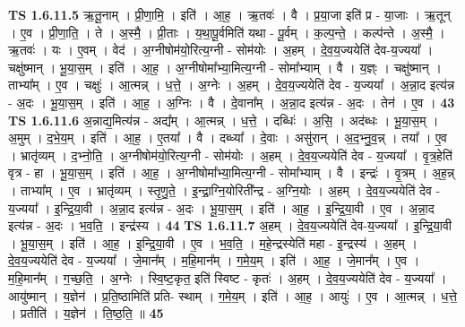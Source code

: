 \documentclass[17pt]{extarticle}
\begin{document}
                                \textbf{ TS 1.6.11.5} \newline
                  ऋ॒तू॒नाम् । प्री॒णा॒मि॒ । इति॑ । आ॒ह॒ । ऋ॒तवः॑ । वै । प्र॒या॒जा इति॑ प्र - या॒जाः । ऋ॒तून् । ए॒व । प्री॒णा॒ति॒ । ते । अ॒स्मै॒ । प्री॒ताः । य॒था॒पू॒र्वमिति॑ यथा - पू॒र्वम् । क॒ल्प॒न्ते॒ । कल्प॑न्ते । अ॒स्मै॒ । ऋ॒तवः॑ । यः । ए॒वम् । वेद॑ । अ॒ग्नीषोम॑यो॒रित्य॒ग्नी - सोम॑योः । अ॒हम् । दे॒व॒य॒ज्ययेति॑ देव-य॒ज्यया᳚ । चक्षु॑ष्मान् । भू॒या॒स॒म् । इति॑ । आ॒ह॒ । अ॒ग्नीषोमा᳚भ्या॒मित्य॒ग्नी - सोमा᳚भ्याम् । वै । य॒ज्ञ्ः । चक्षु॑ष्मान् । ताभ्या᳚म् । ए॒व । चक्षुः॑ । आ॒त्मन्न् । ध॒त्ते॒ । अ॒ग्नेः । अ॒हम् । दे॒व॒य॒ज्ययेति॑ देव - य॒ज्यया᳚ । अ॒न्ना॒द इत्य॑न्न - अ॒दः । भू॒या॒स॒म् । इति॑ । आ॒ह॒ । अ॒ग्निः । वै । दे॒वाना᳚म् । अ॒न्ना॒द इत्य॑न्न - अ॒दः । तेन॑ । ए॒व । \textbf{  43} \newline
                  \newline
                                \textbf{ TS 1.6.11.6} \newline
                  अ॒न्नाद्य॒मित्य॑न्न - अद्य᳚म् । आ॒त्मन्न् । ध॒त्ते॒ । दब्धिः॑ । अ॒सि॒ । अद॑ब्धः । भू॒या॒स॒म् । अ॒मुम् । द॒भे॒य॒म् । इति॑ । आ॒ह॒ । ए॒तया᳚ । वै । दब्ध्या᳚ । दे॒वाः । असु॑रान् । अ॒द॒भ्नु॒व॒॒न्न् । तया᳚ । ए॒व । भ्रातृ॑व्यम् । द॒भ्नो॒ति॒ । अ॒ग्नीषोम॑यो॒रित्य॒ग्नी - सोम॑योः । अ॒हम् । दे॒व॒य॒ज्ययेति॑ देव - य॒ज्यया᳚ । वृ॒त्र॒हेति॑ वृत्र - हा । भू॒या॒स॒म् । इति॑ । आ॒ह॒ । अ॒ग्नीषोमा᳚भ्या॒मित्य॒ग्नी - सोमा᳚भ्याम् । वै । इन्द्रः॑ । वृ॒त्रम् । अ॒ह॒न्न् । ताभ्या᳚म् । ए॒व । भ्रातृ॑व्यम् । स्तृ॒णु॒ते॒ । इ॒न्द्रा॒ग्नि॒योरिती᳚न्द्र - अ॒ग्नि॒योः । अ॒हम् । दे॒व॒य॒ज्ययेति॑ देव - य॒ज्यया᳚ । इ॒न्द्रि॒या॒वी । अ॒न्ना॒द इत्य॑न्न - अ॒दः । भू॒या॒स॒म् । इति॑ । आ॒ह॒ । इ॒न्द्रि॒या॒वी । ए॒व । अ॒न्ना॒द इत्य॑न्न - अ॒दः । भ॒व॒ति॒ । इन्द्र॑स्य । \textbf{  44} \newline
                  \newline
                                \textbf{ TS 1.6.11.7} \newline
                  अ॒हम् । दे॒व॒य॒ज्ययेति॑ देव-य॒ज्यया᳚ । इ॒न्द्रि॒या॒वी । भू॒या॒स॒म् । इति॑ । आ॒ह॒ । इ॒न्द्रि॒या॒वी । ए॒व । भ॒व॒ति॒ । म॒हे॒न्द्रस्येति॑ महा - इ॒न्द्रस्य॑ । अ॒हम् । दे॒व॒य॒ज्ययेति॑ देव - य॒ज्यया᳚ । जे॒मान᳚म् । म॒हि॒मान᳚म् । ग॒मे॒य॒म् । इति॑ । आ॒ह॒ । जे॒मान᳚म् । ए॒व । म॒हि॒मान᳚म् । ग॒च्छ॒ति॒ । अ॒ग्नेः । स्वि॒ष्ट॒कृत॒ इति॑ स्विष्ट - कृतः॑ । अ॒हम् । दे॒व॒य॒ज्ययेति॑ देव - य॒ज्यया᳚ । आयु॑ष्मान् । य॒ज्ञेन॑ । प्र॒ति॒ष्ठामिति॑ प्रति- स्थाम् । ग॒मे॒य॒म् । इति॑ । आ॒ह॒ । आयुः॑ । ए॒व । आ॒त्मन्न् । ध॒त्ते॒ । प्रतीति॑ । य॒ज्ञेन॑ । ति॒ष्ठ॒ति॒ ॥ \textbf{  45} \newline
                  \newline
\end{document}
